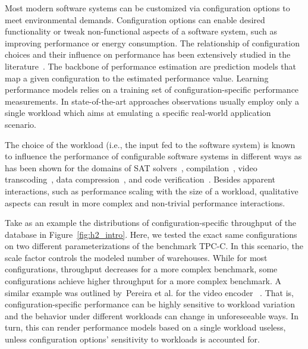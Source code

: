 
Most modern software systems can be customized via configuration options to meet environmental demands. Configuration options can enable desired functionality or tweak non-functional aspects of a software system, such as improving performance or energy consumption. The relationship of configuration choices and their influence on performance has been extensively studied in the literature~\cite{dorn2020,siegmundPerformanceinfluenceModelsHighly2015,haDeepPerf2019,perfAL,guoVariabilityawarePerformancePrediction2013,sarkarCostEfficientSamplingPerformance,guo_2018_data,fourier_learning_2015,perLasso}. The backbone of performance estimation are prediction models that map a given configuration to the estimated performance value. Learning performance models relies on a training set of configuration-specific performance measurements. In state-of-the-art approaches observations usually employ only a single workload which aims at emulating a specific real-world application scenario.

The choice of the workload (i.e., the input fed to the software system) is known to influence the performance of configurable software systems in different ways as has been shown for the domains of SAT solvers~\cite{falkner_sat_solvers_2015,satzilla_2008}, compilation~\cite{ding_compilation_2015,plotnikov_compilation_2013}, video transcoding~\cite{maxiaguine_workload_2004,alves_sampling_2020}, data compression~\cite{khavari_compression_2019}, and code verification~\cite{koc_satune_2021}. Besides apparent interactions, such as performance scaling with the size of a workload, qualitative aspects can result in more complex and non-trivial performance interactions.

Take as an example the distributions of configuration-specific throughput of the database \htwo in Figure~\ref{fig:h2_intro}. Here, we tested the exact same configurations on two different parameterizations of the benchmark \textsf{TPC-C}. In this scenario, the scale factor controls the modeled number of warehouses. While for most configurations, throughput decreases for a more complex benchmark, some configurations achieve higher throughput for a more complex benchmark. A similar example was outlined by~Pereira et al. for the video encoder \xzwo~\cite{alves_sampling_2020}. That is, configuration-specific performance can be highly sensitive to workload variation and the behavior under different workloads can change in unforeseeable ways. In turn, this can render performance models based on a single workload useless, unless configuration options’ sensitivity to workloads is accounted for.

